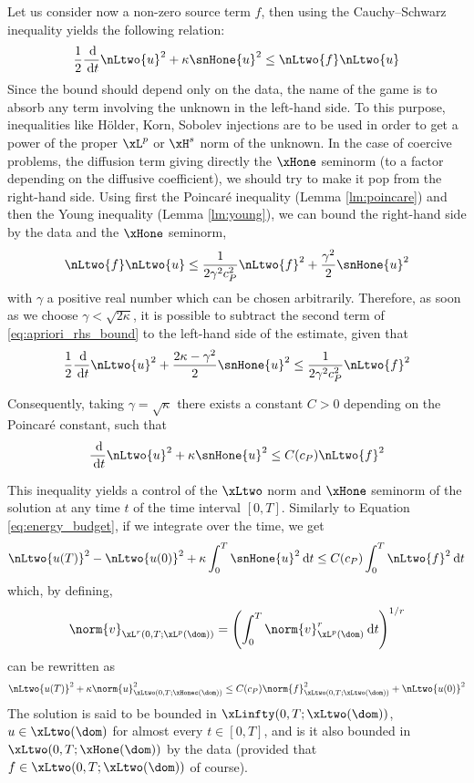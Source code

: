 \medskip
Let us consider now a non-zero source term $f$, then using the Cauchy--Schwarz inequality yields the following relation:
\begin{equation}
\dfrac{1}{2} \ddd{t} \nLtwo{u}^2 + \kappa \snHone{u}^2 \leq \nLtwo{f} \nLtwo{u}
\end{equation}
Since the bound should depend only on the data, the name of the game is to absorb any term involving the unknown in the left-hand side.
To this purpose, inequalities like Hölder, Korn, Sobolev injections are to be used in order to get a power of the proper $\xL^p$ or $\xH^s$ norm of the unknown.
In the case of coercive problems, the diffusion term giving directly the $\xHone$ seminorm (to a factor depending on the diffusive coefficient), we should try to make it pop from the right-hand side.
Using first the Poincaré inequality (Lemma \ref{lm:poincare}) and then the Young inequality (Lemma \ref{lm:young}), we can bound the right-hand side by the data and the $\xHone$ seminorm,
\begin{equation}\label{eq:apriori_rhs_bound}
\nLtwo{f} \nLtwo{u} \leq \dfrac{1}{2 \gamma^2 c_P^2} \nLtwo{f}^2 + \dfrac{\gamma^2}{2}\snHone{u}^2
\end{equation}
with $\gamma$ a positive real number which can be chosen arbitrarily.
Therefore, as soon as we choose $\gamma < \sqrt{2 \kappa}$, it is possible to subtract the second term of \eqref{eq:apriori_rhs_bound} to the left-hand side of the estimate, given that
\begin{equation}
\dfrac{1}{2} \ddd{t} \nLtwo{u}^2 + \dfrac{2\kappa - \gamma^2}{2}  \snHone{u}^2 \leq \dfrac{1}{2 \gamma^2 c_P^2} \nLtwo{f}^2
\end{equation}

Consequently, taking $\gamma= \sqrt{\kappa}$ there exists a constant $C > 0$ depending on the Poincaré constant, such that
\begin{equation}
\ddd{t} \nLtwo{u}^2 + \kappa  \snHone{u}^2 \leq C(c_P) \nLtwo{f}^2
\end{equation}

This inequality yields a control of the $\xLtwo$ norm and $\xHone$ seminorm of the solution at any time $t$ of the time interval $[0,T]$.
Similarly to Equation \eqref{eq:energy_budget}, if we integrate over the time, we get
\begin{equation*}
\nLtwo{u(T)}^2 - \nLtwo{u(0)}^2 + \kappa \int_{0}^T \snHone{u}^2 \dt \leq C(c_P) \int_{0}^T \nLtwo{f}^2 \dt
\end{equation*}
which, by defining,
\begin{equation}
\norm{v}_{\xL^{r}(0,T;\xL^{p}(\dom))} = \Grp{\int_{0}^T \norm{v}_{\xL^p(\dom)}^{r} \dt}^{1/r}
\end{equation}
can be rewritten as
\begin{equation*}
\nLtwo{u(T)}^2 + \kappa \norm{u}_{\xLtwo(0,T;\xHonec(\dom))}^2 \leq C(c_P) \norm{f}_{\xLtwo(0,T;\xLtwo(\dom))}^2 + \nLtwo{u(0)}^2
\end{equation*}
The solution is said to be bounded in $\xLinfty(0,T;\xLtwo(\dom))$, \ie $u \in \xLtwo(\dom)$ for almost every $t \in [0,T]$, and is it also bounded in $\xLtwo(0,T;\xHone(\dom))$ by the data (provided that $f \in \xLtwo(0,T;\xLtwo(\dom))$ of course).

